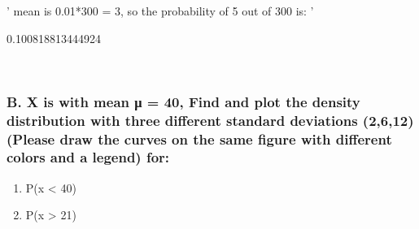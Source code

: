 \documentclass[11pt]{article}
\providecommand{\tightlist}{%
      \setlength{\itemsep}{0pt}\setlength{\parskip}{0pt}}
\begin{document}
    '
mean is 0.01*300 = 3, so the probability of 5 out of 300 is:
'

    
    0.100818813444924

    
    \begin{center}
    \end{center}
    { \hspace*{\fill} \\}
    
    \hypertarget{b.-x-is-with-mean-ux3bc-40-find-and-plot-the-density-distribution-with-three-different-standard-deviations-2612-please-draw-the-curves-on-the-same-figure-with-different-colors-and-a-legend-for}{%
\subsubsection{B. X is with mean μ = 40, Find and plot the density
distribution with three different standard deviations (2,6,12) (Please
draw the curves on the same figure with different colors and a legend)
for:}\label{b.-x-is-with-mean-ux3bc-40-find-and-plot-the-density-distribution-with-three-different-standard-deviations-2612-please-draw-the-curves-on-the-same-figure-with-different-colors-and-a-legend-for}}

\begin{enumerate}
\def\labelenumi{\alph{enumi}.}
\tightlist
\item
  P(x \textless{} 40)
\item
  P(x \textgreater{} 21)
\end{enumerate}
\end{document}
